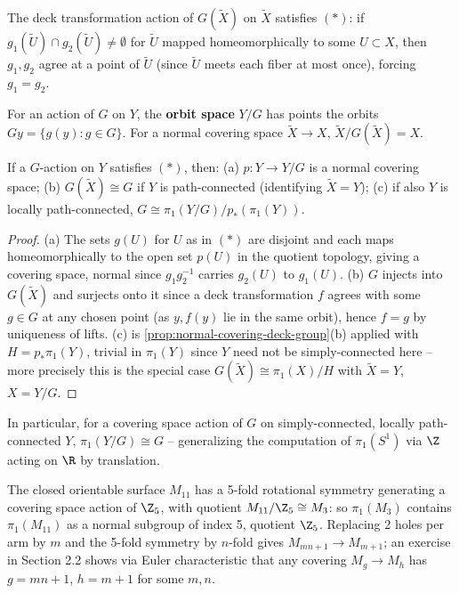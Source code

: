 The deck transformation action of $G(\tilde X)$ on $\tilde X$ satisfies $(*)$: if
$g_1(\tilde U)\cap g_2(\tilde U)\ne\emptyset$ for $\tilde U$ mapped homeomorphically to some
$U\subset X$, then $g_1,g_2$ agree at a point of $\tilde U$ (since $\tilde U$ meets each
fiber at most once), forcing $g_1=g_2$.

\begin{definition}
\label{def:orbit-space}
For an action of $G$ on $Y$, the \textbf{orbit space} $Y/G$ has points the orbits
$Gy = \{g(y):g\in G\}$. For a normal covering space $\tilde X\to X$, $\tilde X/G(\tilde X) = X$.
\end{definition}

\begin{proposition}
\label{prop:covering-space-action-quotient}
If a $G$-action on $Y$ satisfies $(*)$, then: (a) $p:Y\to Y/G$ is a normal covering
space; (b) $G(\tilde X) \cong G$ if $Y$ is path-connected (identifying $\tilde X = Y$); (c) if
also $Y$ is locally path-connected, $G \cong \pi_1(Y/G)/p_*(\pi_1(Y))$.
\end{proposition}

\begin{proof}
(a) The sets $g(U)$ for $U$ as in $(*)$ are disjoint and each maps homeomorphically
to the open set $p(U)$ in the quotient topology, giving a covering space, normal since
$g_1g_2^{-1}$ carries $g_2(U)$ to $g_1(U)$. (b) $G$ injects into $G(\tilde X)$ and surjects
onto it since a deck transformation $f$ agrees with some $g\in G$ at any chosen
point (as $y,f(y)$ lie in the same orbit), hence $f=g$ by uniqueness of lifts. (c) is
\cref{prop:normal-covering-deck-group}(b) applied with $H=p_*\pi_1(Y)$, trivial in $\pi_1(Y)$
since $Y$ need not be simply-connected here -- more precisely this is the special
case $G(\tilde X)\cong\pi_1(X)/H$ with $\tilde X = Y$, $X = Y/G$.
\end{proof}

In particular, for a covering space action of $G$ on simply-connected, locally
path-connected $Y$, $\pi_1(Y/G) \cong G$ -- generalizing the computation of
$\pi_1(S^1)$ via $\Z$ acting on $\R$ by translation.

\begin{example}
\label{ex:genus-11-torus-covering}
The closed orientable surface $M_{11}$ has a 5-fold rotational symmetry generating
a covering space action of $\Z_5$, with quotient $M_{11}/\Z_5 \cong M_3$: so $\pi_1(M_3)$
contains $\pi_1(M_{11})$ as a normal subgroup of index 5, quotient $\Z_5$. Replacing 2
holes per arm by $m$ and the 5-fold symmetry by $n$-fold gives
$M_{mn+1} \to M_{m+1}$; an exercise in Section 2.2 shows via Euler
characteristic that any covering $M_g\to M_h$ has $g=mn+1$, $h=m+1$ for some
$m,n$.


\end{example}

